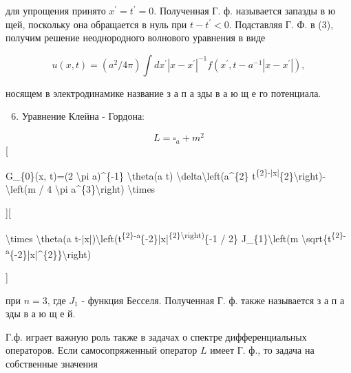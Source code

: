 \documentclass[10pt]{article}
\begin{document}
для упрощения принято $x^{\prime}=t^{\prime}=0$. Полученная Г. ф. называется запазды в ю щей, поскольку она обращается в нуль при $t-t^{\prime}<0$. Подставляя Г. Ф. в (3), получим решение неоднородного волнового уравнения в виде



\[

u(x, t)=\left(a^{2} / 4 \pi\right) \int d x^{\prime}\left|x-x^{\prime}\right|^{-1} f\left(x^{\prime}, t-a^{-1}\left|x-x^{\prime}\right|\right),

\]



носящем в электродинамике название з а п а зды в а ю щ е го потенциала.



\begin{enumerate}

  \setcounter{enumi}{5}

  \item Уравнение Клейна - Гордона:

\end{enumerate}



\[

L=\square_{a}+m^{2}

\][



G\_\{0\}(x, t)=(2 \textbackslash pi a)\^{}\{-1\} \textbackslash theta(a t) \textbackslash delta\textbackslash left(a\^{}\{2\} t\textsuperscript{\{2\}-|x|}\{2\}\textbackslash right)-\textbackslash left(m / 4 \textbackslash pi a\^{}\{3\}\textbackslash right) \textbackslash times



][



\textbackslash times \textbackslash theta(a t-|x|)\textbackslash left(t\textsuperscript{\{2\}-a}\{-2\}|x|\textsuperscript{\{2\}\textbackslash right)}\{-1 / 2\} J\_\{1\}\textbackslash left(m \textbackslash sqrt\{t\textsuperscript{\{2\}-a}\{-2\}|x|\^{}\{2\}\}\textbackslash right)

]



при $n=3$, где $J_{1}$ - функция Бесселя. Полученная Г. ф. также называется з а п а зды в а ю щ е й.



Г.ф. играет важную роль также в задачах о спектре дифференциальных операторов. Если самосопряженный оператор $L$ имеет Г. ф., то задача на собственные значения
\end{document}
